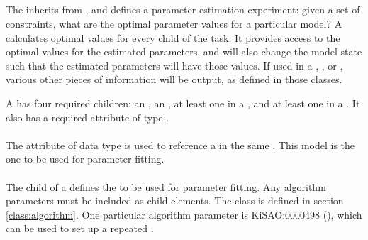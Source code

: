 \begin{blockChanged}
\subsection{}
\label{class:parameterEstimationTask}
\label{class:listOfAdjustableParameters}
\label{class:listOfFitExperiments}

The \ParameterEstimationTask inherits from \AbstractTask, and defines a parameter estimation experiment:  given a set of constraints, what are the optimal parameter values for a particular model? A \ParameterEstimationTask calculates optimal \AdjustableParameter values for every \FitExperiment child of the task.   It  provides access to the optimal values for the estimated parameters, and will also change the model state such that the estimated parameters will have those values.  If used in a \ParameterEstimationResultPlot, \WaterfallPlot, or \ParameterEstimationReport, various other pieces of information will be output, as defined in those classes.



A \ParameterEstimationTask has four required children: an \Algorithm, an \Objective, at least one \AdjustableParameter in a \ListOfAdjustableParameters, and at least one \FitExperiment in a \ListOfFitExperiments.  It also has a required  attribute of type \SIdRef.

\paragraph*{}
The  attribute of data type \SIdRef is used to reference a \Model in the same \SedDocument.  This model is the one to be used for parameter fitting.


\paragraph*{}
The  child of a \ParameterEstimationTask defines the \Algorithm to be used for parameter fitting.  Any algorithm parameters must be included as child \AlgorithmParameter elements.  The \Algorithm class is defined in section \ref{class:algorithm}.  One particular algorithm parameter is KiSAO:0000498 (), which can be used to set up a repeated \ParameterEstimationTask.



\end{blockChanged}
